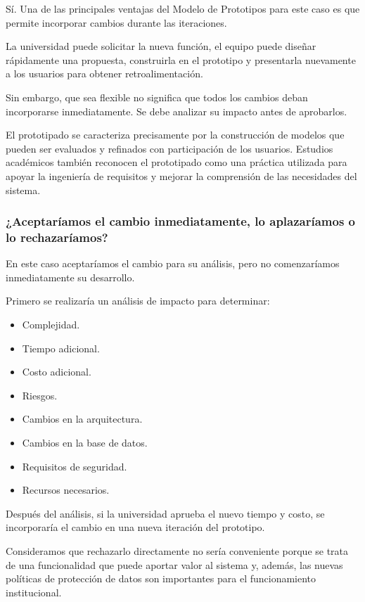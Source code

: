 \documentclass[pdflatex,sn-mathphys-num]{sn-jnl}%
\theoremstyle{thmstyleone}%
\theoremstyle{thmstyletwo}%
\theoremstyle{thmstylethree}%
\begin{document}
 Sí. Una de las principales ventajas del Modelo de Prototipos para este caso es que permite incorporar cambios durante las iteraciones.
 
 La universidad puede solicitar la nueva función, el equipo puede diseñar rápidamente una propuesta, construirla en el prototipo y presentarla nuevamente a los usuarios para obtener retroalimentación.
 
 Sin embargo, que sea flexible no significa que todos los cambios deban incorporarse inmediatamente. Se debe analizar su impacto antes de aprobarlos.
 
 El prototipado se caracteriza precisamente por la construcción de modelos que pueden ser evaluados y refinados con participación de los usuarios. Estudios académicos también reconocen el prototipado como una práctica utilizada para apoyar la ingeniería de requisitos y mejorar la comprensión de las necesidades del sistema.
 
 
 \subsubsection{¿Aceptaríamos el cambio inmediatamente, lo aplazaríamos o lo rechazaríamos?}
 
 En este caso aceptaríamos el cambio para su análisis, pero no comenzaríamos inmediatamente su desarrollo.
 
 Primero se realizaría un análisis de impacto para determinar:
 
 \begin{itemize}
 	\item Complejidad.
 	\item Tiempo adicional.
 	\item Costo adicional.
 	\item Riesgos.
 	\item Cambios en la arquitectura.
 	\item Cambios en la base de datos.
 	\item Requisitos de seguridad.
 	\item Recursos necesarios.
 \end{itemize}
 
 Después del análisis, si la universidad aprueba el nuevo tiempo y costo, se incorporaría el cambio en una nueva iteración del prototipo.
 
 Consideramos que rechazarlo directamente no sería conveniente porque se trata de una funcionalidad que puede aportar valor al sistema y, además, las nuevas políticas de protección de datos son importantes para el funcionamiento institucional.
 
\end{document}
